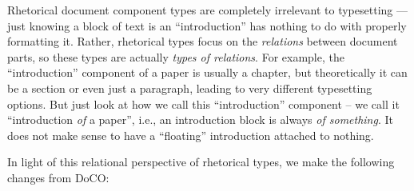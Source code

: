Rhetorical document component types are completely irrelevant to typesetting --- just knowing a block of text is an ``introduction'' has nothing to do with properly formatting it. Rather, rhetorical types focus on the \emph{relations} between document parts, so these types are actually \emph{types of relations}. For example, the ``introduction'' component of a paper is usually a chapter, but theoretically it can be a section or even just a paragraph, leading to very different typesetting options. But just look at how we call this ``introduction'' component -- we call it ``introduction \emph{of} a paper'', i.e., an introduction block is always \emph{of something}. It does not make sense to have a ``floating'' introduction attached to nothing. 

In light of this relational perspective of rhetorical types, we make the following changes from DoCO:

